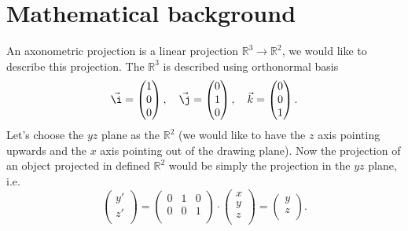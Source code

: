 \documentclass[11pt,a4paper]{article}
\begin{document}
\section{Mathematical background}


An axonometric projection is a linear projection $ \mathbb{R}^{3}\rightarrow\mathbb{R}^{2} $, we would like to describe this projection. The $ \mathbb{R}^{3} $ is described using orthonormal basis
\begin{equation}
\vec{\i}=
\begin{pmatrix}
1 \\
0 \\
0 \\
\end{pmatrix}, \quad
\vec{\j}=
\begin{pmatrix}
0 \\
1 \\
0 \\
\end{pmatrix}, \quad
\vec{k}=
\begin{pmatrix}
0 \\
0 \\
1 \\
\end{pmatrix}.
\end{equation}
Let's choose the $ yz $ plane as the $ \mathbb{R}^{2} $ (we would like to have the $ z $ axis pointing upwards and the $ x $ axis pointing out of the drawing plane). Now the projection of an object projected in defined $ \mathbb{R}^{2} $ would be simply the projection in the $ yz $ plane, i.e.
\begin{equation}
\begin{pmatrix}
y' \\
z' \\
\end{pmatrix}
=
\begin{pmatrix}
0 & 1 & 0 \\
0 & 0 & 1 \\
\end{pmatrix}
\cdot
\begin{pmatrix}
x \\
y \\
z \\
\end{pmatrix}
=
\begin{pmatrix}
y \\
z \\
\end{pmatrix}.
\end{equation}
\end{document}
